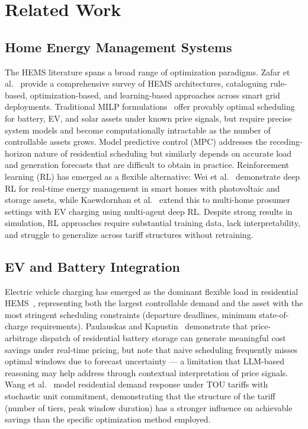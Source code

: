 \documentclass[conference]{IEEEtran}
\begin{document}
\section{Related Work}
\label{sec:related}

\subsection{Home Energy Management Systems}
The HEMS literature spans a broad range of optimization paradigms.
Zafar et al.~\cite{zafar2020hems} provide a comprehensive survey of HEMS
architectures, cataloguing rule-based, optimization-based, and learning-based
approaches across smart grid deployments.
Traditional MILP formulations~\cite{pinto2023milp} offer provably optimal
scheduling for battery, EV, and solar assets under known price signals,
but require precise system models and become computationally intractable
as the number of controllable assets grows.
Model predictive control (MPC) addresses the receding-horizon nature of
residential scheduling but similarly depends on accurate load and generation
forecasts that are difficult to obtain in practice.
Reinforcement learning (RL) has emerged as a flexible alternative:
Wei et al.~\cite{wei2023drl} demonstrate deep RL for real-time energy
management in smart homes with photovoltaic and storage assets, while
Kaewdornhan et al.~\cite{kaewdornhan2023marl} extend this to multi-home
prosumer settings with EV charging using multi-agent deep RL.
Despite strong results in simulation, RL approaches require substantial
training data, lack interpretability, and struggle to generalize across
tariff structures without retraining.

\subsection{EV and Battery Integration}
Electric vehicle charging has emerged as the dominant flexible load in
residential HEMS~\cite{buijze2024ev}, representing both the largest
controllable demand and the asset with the most stringent scheduling
constraints (departure deadlines, minimum state-of-charge requirements).
Paulauskas and Kapustin~\cite{paulauskas2024battery} demonstrate that
price-arbitrage dispatch of residential battery storage can generate
meaningful cost savings under real-time pricing, but note that naive
scheduling frequently misses optimal windows due to forecast uncertainty ---
a limitation that LLM-based reasoning may help address through contextual
interpretation of price signals.
Wang et al.~\cite{wang2021tou} model residential demand response under
TOU tariffs with stochastic unit commitment, demonstrating that the
structure of the tariff (number of tiers, peak window duration) has a
stronger influence on achievable savings than the specific optimization
method employed.
\end{document}
